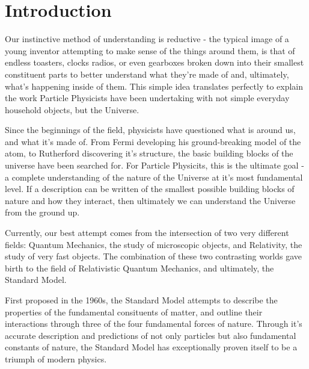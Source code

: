 
\chapter{Introduction}  %

\ifpdf
    \graphicspath{{Chapter1/Figs/Raster/}{Chapter1/Figs/PDF/}{Chapter1/Figs/}}
\else
    \graphicspath{{Chapter1/Figs/Vector/}{Chapter1/Figs/}}
\fi


\label{sec:introduction_intro}

Our instinctive method of understanding is reductive - the typical image of a
young inventor attempting to make sense of the things around them, is
that of endless toasters, clocks radios, or even gearboxes broken down into
their smallest constituent parts to better understand what they're made of and,
ultimately, what's happening inside of them. This simple idea translates
perfectly to explain the work Particle Physicists have been undertaking with
not simple everyday household objects, but the Universe.

Since the beginnings of the field, physicists have questioned
what is
around us, and what it's made of. From Fermi developing his ground-breaking
model of the atom, to Rutherford discovering it's structure, the basic building
blocks of the universe have been searched for. For Particle Physicits, this is
the ultimate goal - a complete understanding of the nature of the Universe
at it's most
fundamental level. If a description can be written of the smallest possible
building blocks of
nature and how they interact, then ultimately we can understand
the Universe from the ground up.

Currently, our best attempt comes from the intersection of two very different
fields: Quantum Mechanics, the study of microscopic objects, and Relativity, the
study of very fast objects. The combination of these
two contrasting worlds gave birth to the field of Relativistic
Quantum Mechanics, and ultimately, the Standard Model.

First proposed in the 1960s, the Standard Model attempts to describe the
properties of the fundamental consituents of matter, and outline their
interactions through three of the four fundamental forces of nature. Through
it's accurate description and predictions of not only particles
but also fundamental constants of nature, the
Standard Model has exceptionally proven itself to be a triumph of
modern physics.

